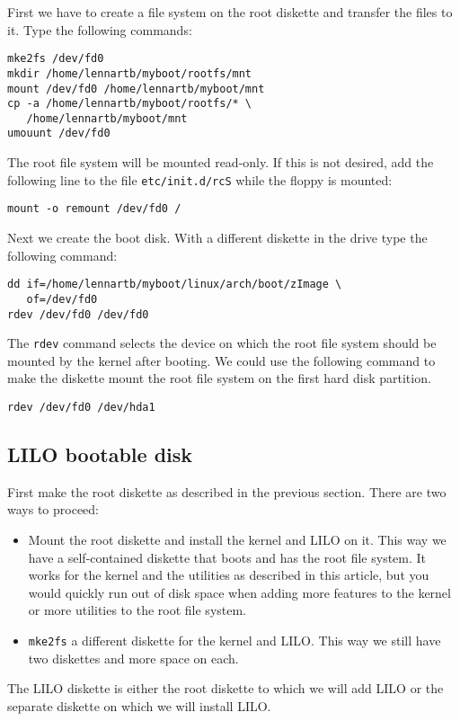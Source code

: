 \documentclass[12pt,a4paper]{article}
\begin{document}
First we have to create a file system on the root diskette and
transfer the files to it. Type the following commands:
\begin{verbatim}
mke2fs /dev/fd0
mkdir /home/lennartb/myboot/rootfs/mnt
mount /dev/fd0 /home/lennartb/myboot/mnt
cp -a /home/lennartb/myboot/rootfs/* \
   /home/lennartb/myboot/mnt
umouunt /dev/fd0
\end{verbatim}
The root file system will be mounted read-only. If this is not
desired, add the following line to the file {\tt etc/init.d/rcS} while
the floppy is mounted:
\begin{verbatim}
mount -o remount /dev/fd0 /
\end{verbatim}

Next we create the boot disk. With a different diskette in the drive
type  the following command:
\begin{verbatim}
dd if=/home/lennartb/myboot/linux/arch/boot/zImage \
   of=/dev/fd0
rdev /dev/fd0 /dev/fd0
\end{verbatim}
The {\tt rdev} command selects the device on which the root file
system should be mounted by the kernel after booting. We could use the
following command to make the diskette mount the root file system on
the first hard disk partition.
\begin{verbatim}
rdev /dev/fd0 /dev/hda1
\end{verbatim}

\subsection{LILO bootable disk}

First make the root diskette as described in the previous
section. There are two ways to proceed:
\begin{itemize}
\item Mount the root diskette and install the kernel and LILO on
  it. This way we have a self-contained diskette that boots and has
  the root file system. It works for the kernel and the utilities as
  described in this article, but you would quickly run out of disk
  space when adding more features to the kernel or more utilities to
  the root file system.
\item {\tt mke2fs} a different diskette for the kernel and LILO. This
  way we still have two diskettes and more space on each.
\end{itemize}
The LILO diskette is either the root diskette to which we will add
LILO or the separate diskette on which we will install LILO.
\end{document}
